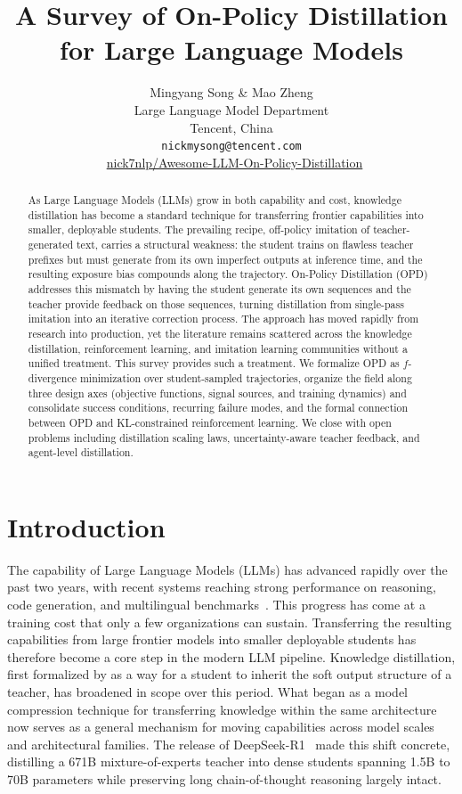 \documentclass{article} %
\title{A Survey of On-Policy Distillation for Large Language Models}
\author{Mingyang Song \& Mao Zheng \\
Large Language Model Department \\Tencent, China\\
\texttt{nickmysong@tencent.com}\\[2pt]
\faGithub\ \href{https://github.com/nick7nlp/Awesome-LLM-On-Policy-Distillation}{nick7nlp/Awesome-LLM-On-Policy-Distillation}}
\begin{document}
\maketitle

\begin{abstract}
As Large Language Models (LLMs) grow in both capability and cost, knowledge distillation has become a standard technique for transferring frontier capabilities into smaller, deployable students. The prevailing recipe, off-policy imitation of teacher-generated text, carries a structural weakness: the student trains on flawless teacher prefixes but must generate from its own imperfect outputs at inference time, and the resulting exposure bias compounds along the trajectory. On-Policy Distillation (OPD) addresses this mismatch by having the student generate its own sequences and the teacher provide feedback on those sequences, turning distillation from single-pass imitation into an iterative correction process. The approach has moved rapidly from research into production, yet the literature remains scattered across the knowledge distillation, reinforcement learning, and imitation learning communities without a unified treatment. This survey provides such a treatment. We formalize OPD as $f$-divergence minimization over student-sampled trajectories, organize the field along three design axes (objective functions, signal sources, and training dynamics) and consolidate success conditions, recurring failure modes, and the formal connection between OPD and KL-constrained reinforcement learning. We close with open problems including distillation scaling laws, uncertainty-aware teacher feedback, and agent-level distillation.
\end{abstract}

\section{Introduction}
\label{sec:intro}

The capability of Large Language Models (LLMs) has advanced rapidly over the past two years, with recent systems reaching strong performance on reasoning, code generation, and multilingual benchmarks~\citep{2505.09388,2501.12948,2408.00118}. This progress has come at a training cost that only a few organizations can sustain. Transferring the resulting capabilities from large frontier models into smaller deployable students has therefore become a core step in the modern LLM pipeline. Knowledge distillation, first formalized by \citet{1503.02531} as a way for a student to inherit the soft output structure of a teacher, has broadened in scope over this period. What began as a model compression technique for transferring knowledge within the same architecture now serves as a general mechanism for moving capabilities across model scales and architectural families. The release of DeepSeek-R1~\citep{2501.12948} made this shift concrete, distilling a 671B mixture-of-experts teacher into dense students spanning 1.5B to 70B parameters while preserving long chain-of-thought reasoning largely intact.
\end{document}
